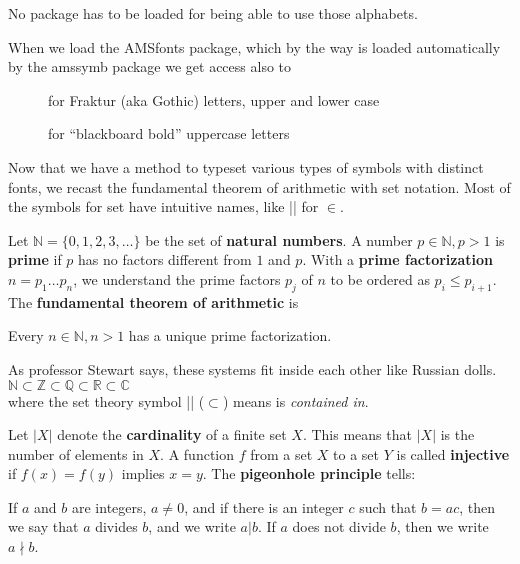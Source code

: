 No package has to be loaded for being able to use those alphabets.

When we load the AMSfonts package, which by the way is loaded automatically by the amssymb package we get access also to

\begin{description}
\item[] for Fraktur (aka Gothic) letters, upper and lower case
\item[] for \enquote{blackboard bold} uppercase letters
\end{description}



Now that we have a method to typeset various types of symbols with distinct fonts, we recast
the fundamental theorem of arithmetic with set notation. Most of the symbols for set have
intuitive names, like |\in| for $\in$. 

Let $\mathbb{N} = \{0,1,2,3, \dots \}$ be the set of {\bf natural numbers}.
A number $p \in \mathbb{N}, p>1$ is {\bf prime} if $p$ has no factors different from $1$ and $p$. 
With a {\bf prime factorization} $n=p_1 \dots p_n$, we understand the prime factors $p_j$
of $n$ to be ordered as $p_i \leq p_{i+1}$. The {\bf fundamental theorem of arithmetic} is

\begin{theorem}
Every $n \in \mathbb{N}, n>1$ has a unique prime factorization.
\end{theorem}

As professor Stewart says, these systems fit inside each other like Russian dolls.\\
$\mathbb{N}\subset \mathbb{Z} \subset \mathbb{Q} \subset \mathbb{R} \subset \mathbb{C}$\\
where the set theory symbol |\subset| ($\subset$) means is \textit{contained in}.

Let $\vert X\vert$ denote the {\bf cardinality} of a finite set $X$. This means that
$\vert X\vert$ is the number of elements in $X$. A function $f$ from a set $X$ to a set $Y$
is called {\bf injective} if $f(x)=f(y)$ implies $x=y$. The {\bf pigeonhole principle} tells:

\begin{Definition}
If $a$ and $b$ are integers, $a \neq 0$, and if there is an integer $c$ such that $b = ac$, then we say that $a$ divides $b$, and we write $a\vert b$. If $a$ does not divide $b$, then we write $a \nmid b$.
\end{Definition}

